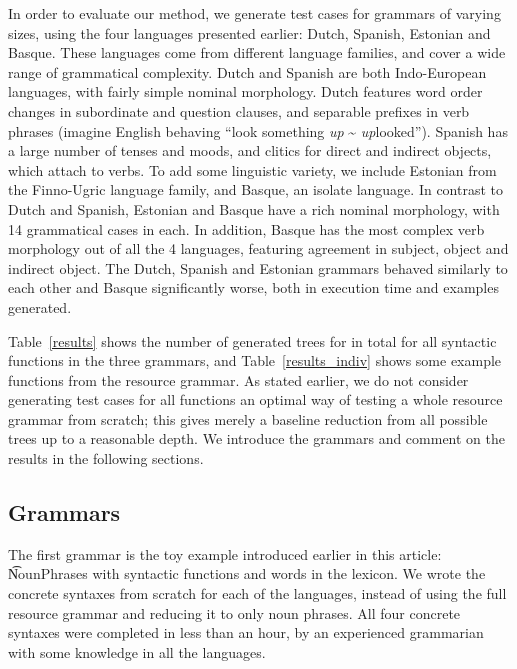In order to evaluate our method, we generate test cases for grammars
of varying sizes, using the four languages presented earlier: Dutch, Spanish,
Estonian and Basque. These languages come from different language
families, and cover a wide range of grammatical complexity. Dutch and
Spanish are both Indo-European languages, with fairly simple nominal
morphology. Dutch features word order changes in subordinate and
question clauses, and separable prefixes in verb phrases (imagine
English behaving ``look something \emph{up} \~{} {\it up}looked''). 
Spanish has a large number of tenses and moods, and clitics for direct
and indirect objects, which attach to verbs.  To add some linguistic
variety, we include Estonian from the Finno-Ugric language family, and
Basque, an isolate language.  In contrast to Dutch and Spanish,
Estonian and Basque have a rich nominal morphology, with 14
grammatical cases in each. In addition, Basque has the most complex
verb morphology out of all the 4 languages, featuring agreement in
subject, object and indirect object.
The Dutch, Spanish and Estonian grammars behaved similarly to each other
and Basque significantly worse, both in execution time and examples
generated.

Table~\ref{results} shows the number of generated trees for 
in total for all syntactic functions in the three grammars, and
Table~\ref{results_indiv} shows some example functions from the resource grammar. 
As stated earlier, we do not consider generating test cases for all
functions an optimal way of testing a whole resource grammar from scratch;
this gives merely a baseline reduction from all possible trees up to a
reasonable depth. We introduce the grammars and comment on the results
in the following sections. 

\subsection{Grammars}

The first grammar is the toy example introduced earlier in this
article: \t{NounPhrases} with \numOfFun syntactic functions and
\numOfLex words in the lexicon. We wrote the concrete syntaxes from
scratch for each of the languages, instead of using the full resource
grammar and reducing it to only noun phrases. All four concrete
syntaxes were completed in less than an hour, by an experienced
grammarian with some knowledge in all the languages.

